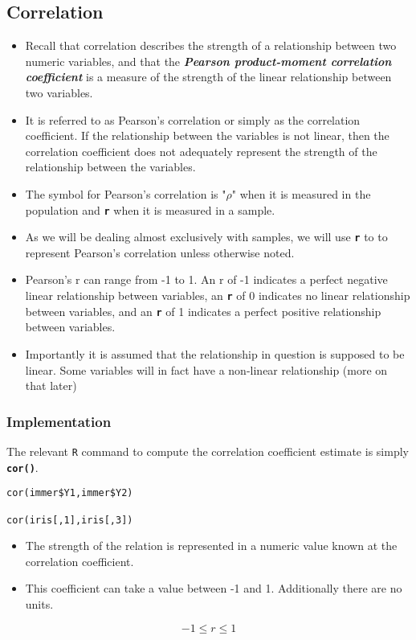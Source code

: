 \documentclass[a4paper,12pt]{article}
\begin{document}
\subsection{Correlation}
\begin{itemize}
\item Recall that correlation describes the strength of a relationship between two numeric variables, and that the \textbf{\textit{Pearson product-moment correlation coefficient}} is a measure of the strength of the linear relationship between two variables.

\item It is referred to as Pearson's correlation or simply as the correlation coefficient. If the relationship between the variables is not linear, then the correlation coefficient does not adequately represent the strength of the relationship between the variables.

\item The symbol for Pearson's correlation is "$\rho$" when it is measured in the population and \texttt{\textbf{r}} when it is measured in a sample.

\item As we will be dealing almost exclusively with samples, we will use \texttt{\textbf{r}} to to represent Pearson's correlation unless otherwise noted.

\item Pearson's r can range from -1 to 1. An r of -1 indicates a perfect negative linear relationship between variables, an \texttt{\textbf{r}} of 0 indicates no linear relationship between variables, and an \texttt{\textbf{r}} of 1 indicates a perfect positive relationship between variables.

\item Importantly it is assumed that the relationship in question is supposed to be linear. Some variables will in fact have a non-linear relationship (more on that later)
\end{itemize}
\subsubsection*{Implementation}
The relevant \texttt{R} command to compute the correlation coefficient estimate is simply \texttt{\textbf{cor()}}.


\begin{framed}
\begin{verbatim}
cor(immer$Y1,immer$Y2)

cor(iris[,1],iris[,3])
\end{verbatim}
\end{framed}
\begin{itemize}
\item The strength of the relation is represented in a numeric value known at the correlation coefficient. 
\item This coefficient can take a value between -1 and 1. Additionally there are no units.
\end{itemize}
\[ -1 \leq r \leq 1\]
\end{document}
